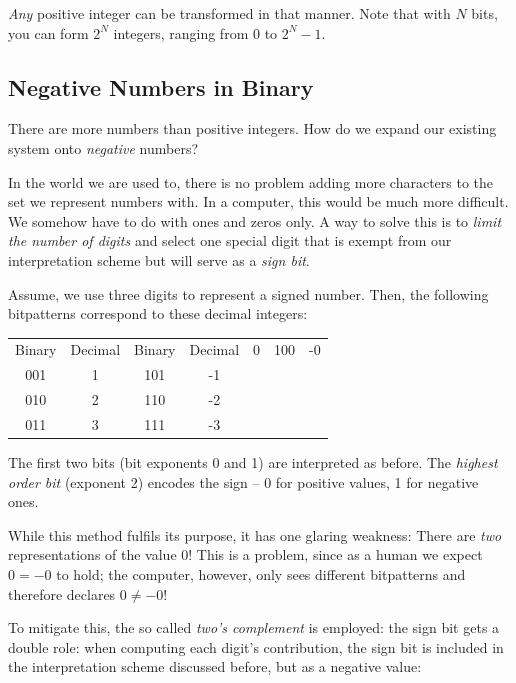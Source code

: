 \emph{Any} positive integer can be transformed in that manner. Note that with $N$ bits, you can form $2^N$ integers, ranging from $0$ to $2^N - 1$.

\subsection{Negative Numbers in Binary}
There are more numbers than positive integers\citationneeded. How do we expand our existing system onto \emph{negative} numbers?

In the world we are used to, there is no problem adding more characters to the set we represent numbers with. In a computer, this would be much more difficult. We somehow have to do with ones and zeros only. A way to solve this is to \emph{limit the number of digits} and select one special digit that is exempt from our interpretation scheme but will serve as a \emph{sign bit}.

\begin{defbox}
Assume, we use three digits to represent a signed number. Then, the following bitpatterns correspond to these decimal integers:

\begin{center}
\begin{tabular}{cc|cc}
Binary & Decimal & Binary & Decimal  & 0 & 100 & -0 \\
001 & 1 & 101 & -1 \\
010 & 2 & 110 & -2 \\
011 & 3 & 111 & -3
\end{tabular}
\end{center}

The first two bits (bit exponents 0 and 1) are interpreted as before. The \emph{highest order bit} (exponent 2) encodes the sign -- 0 for positive values, 1 for negative ones.
\end{defbox}

While this method fulfils its purpose, it has one glaring weakness: There are \emph{two} representations of the value $0$! This is a problem, since as a human we expect $0 = -0$ to hold; the computer, however, only sees different bitpatterns and therefore declares $0 \neq -0$!

To mitigate this, the so called \emph{two's complement} is employed: the sign bit gets a double role: when computing each digit's contribution, the sign bit is included in the interpretation scheme discussed before, but as a negative value:

